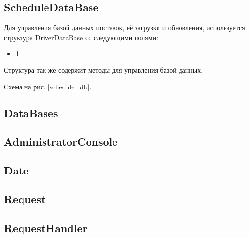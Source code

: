 
\subsection{ScheduleDataBase}

Для управления базой данных поставок, 
её загрузки и обновления, 
используется структура DriverDataBase со следующими полями: 

\begin{itemize}
    \item 1
\end{itemize}

Структура так же содержит методы для управления базой данных.

Схема на рис. \ref{schedule_db}.


\subsection{DataBases}
\subsection{AdministratorConsole}
\subsection{Date}
\subsection{Request}
\subsection{RequestHandler}
